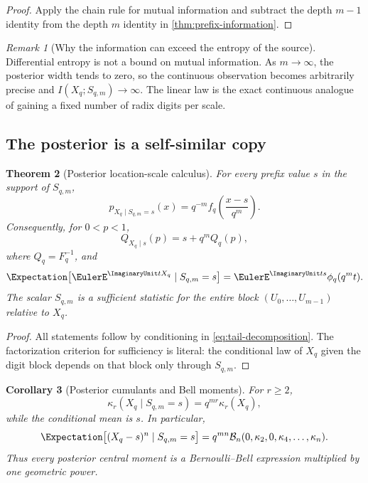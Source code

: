 \documentclass[11pt,oneside]{article}
\newtheorem{theorem}{Theorem}[section]
\newtheorem{corollary}[theorem]{Corollary}
\theoremstyle{definition}
\theoremstyle{remark}
\newtheorem{remark}[theorem]{Remark}
\begin{document}
\begin{proof}
Apply the chain rule for mutual information and subtract the depth $m-1$ identity
from the depth $m$ identity in \cref{thm:prefix-information}.
\end{proof}

\begin{remark}[Why the information can exceed the entropy of the source]
Differential entropy is not a bound on mutual information.  As $m\to\infty$, the
posterior width tends to zero, so the continuous observation becomes arbitrarily
precise and $I(X_q;S_{q,m})\to\infty$.  The linear law is the exact continuous
analogue of gaining a fixed number of radix digits per scale.
\end{remark}

\subsection{The posterior is a self-similar copy}

\begin{theorem}[Posterior location-scale calculus]
\label{thm:posterior}
For every prefix value $s$ in the support of $S_{q,m}$,
\begin{equation}
 p_{X_q\mid S_{q,m}=s}(x)
 =q^{-m}f_q\!\left(\frac{x-s}{q^m}\right).
 \label{eq:posterior-density}
\end{equation}
Consequently, for $0<p<1$,
\begin{equation}
 Q_{X_q\mid s}(p)=s+q^mQ_q(p),
 \label{eq:posterior-quantile}
\end{equation}
where $Q_q=F_q^{-1}$, and
\begin{equation}
 \Expectation\bigl[\EulerE^{\ImaginaryUnit tX_q}\mid S_{q,m}=s\bigr]
 =\EulerE^{\ImaginaryUnit ts}\phi_q(q^mt).
 \label{eq:posterior-cf}
\end{equation}
The scalar $S_{q,m}$ is a sufficient statistic for the entire block
$(U_0,\ldots,U_{m-1})$ relative to $X_q$.
\end{theorem}

\begin{proof}
All statements follow by conditioning in \eqref{eq:tail-decomposition}.  The
factorization criterion for sufficiency is literal: the conditional law of $X_q$
given the digit block depends on that block only through $S_{q,m}$.
\end{proof}

\begin{corollary}[Posterior cumulants and Bell moments]
\label{cor:posterior-cumulants}
For $r\ge2$,
\begin{equation}
 \kappa_r(X_q\mid S_{q,m}=s)=q^{mr}\kappa_r(X_q),
 \label{eq:posterior-cumulants}
\end{equation}
while the conditional mean is $s$.  In particular,
\begin{equation}
 \Expectation\bigl[(X_q-s)^n\mid S_{q,m}=s\bigr]
 =q^{mn}\mathcal B_n(0,\kappa_2,0,\kappa_4,\ldots,\kappa_n).
 \label{eq:posterior-Bell}
\end{equation}
Thus every posterior central moment is a Bernoulli--Bell expression multiplied by
one geometric power.
\end{corollary}
\end{document}
